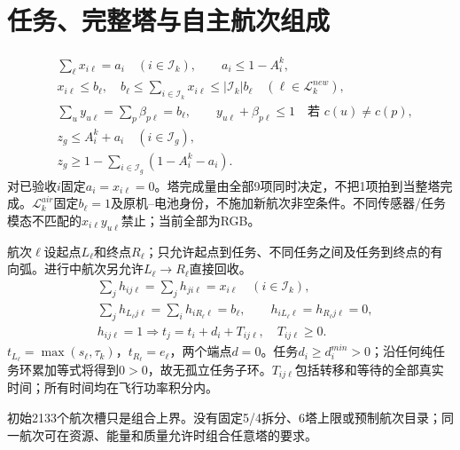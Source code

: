 \section{任务、完整塔与自主航次组成}
\begin{align}
 &\sum_{\ell}x_{i\ell}=a_i\quad(i\in\mathcal I_k),\qquad a_i\le1-A_i^k,\\
 &x_{i\ell}\le b_\ell,\quad
 b_\ell\le\sum_{i\in\mathcal I_k}x_{i\ell}\le|\mathcal I_k|b_\ell
       \quad(\ell\in\mathcal L_k^{new}),\label{eng:eq:assign}\\
 &\sum_u y_{u\ell}=\sum_p\beta_{p\ell}=b_\ell,\qquad
 y_{u\ell}+\beta_{p\ell}\le1\quad\text{若 }c(u)\ne c(p),\label{eng:eq:fleet}\\
 &z_g\le A_i^k+a_i\quad(i\in\mathcal I_g),\\
 &z_g\ge1-\sum_{i\in\mathcal I_g}(1-A_i^k-a_i).
 \label{eng:eq:complete}
\end{align}
\noindent 对已验收$i$固定$a_i=x_{i\ell}=0$。塔完成量由全部9项同时决定，不把1项拍到当整塔完成。$\mathcal L_k^{air}$固定$b_\ell=1$及原机--电池身份，不施加新航次非空条件。不同传感器/任务模态不匹配的$x_{i\ell}y_{u\ell}$禁止；当前全部为RGB。

\noindent 航次$\ell$设起点$L_\ell$和终点$R_\ell$；只允许起点到任务、不同任务之间及任务到终点的有向弧。进行中航次另允许$L_\ell\to R_\ell$直接回收。
\begin{align}
 &\sum_jh_{ij\ell}=\sum_jh_{ji\ell}=x_{i\ell}\quad(i\in\mathcal I_k),\\
 &\sum_jh_{L_\ell j\ell}=\sum_i h_{iR_\ell\ell}=b_\ell,\qquad
 h_{iL_\ell\ell}=h_{R_\ell j\ell}=0,\\
 &h_{ij\ell}=1\Rightarrow t_j=t_i+d_i+T_{ij\ell},\quad T_{ij\ell}\ge0.
 \label{eng:eq:sequence}
\end{align}
\noindent $t_{L_\ell}=\max(s_\ell,\tau_k)$，$t_{R_\ell}=e_\ell$，两个端点$d=0$。任务$d_i\ge d_i^{min}>0$；沿任何纯任务环累加等式将得到$0>0$，故无孤立任务子环。$T_{ij\ell}$包括转移和等待的全部真实时间；所有时间均在飞行功率积分内。

\noindent 初始2133个航次槽只是组合上界。没有固定5/4拆分、6塔上限或预制航次目录；同一航次可在资源、能量和质量允许时组合任意塔的要求。
\clearpage

